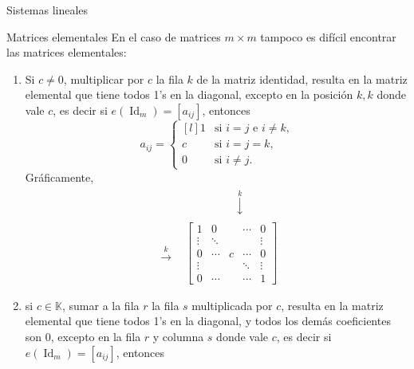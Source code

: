 \documentclass[a4paper,12pt,twoside,spanish,reqno]{amsbook}
\theoremstyle{definition}
\theoremstyle{remark}
\newcommand{\Id}{\operatorname{Id}}
\newcommand{\K}{\mathbb K}
\begin{document}
\begin{chapter}{Sistemas lineales}
\begin{section}{Matrices elementales}
            En el caso de matrices $m \times m$ tampoco es difícil encontrar las matrices elementales:
            \begin{enumerate}
                \item Si $c \not=0$, multiplicar por  $c$ la fila $k$ de la matriz identidad, resulta en la matriz elemental que tiene todos 1's en la diagonal, excepto en la posición $k,k$ donde vale $c$,  es decir si $e(\Id_m) = [a_{ij}]$,  entonces
                \begin{equation}\label{elem-tipo-1}
                a_{ij} = \left\{ 
                \begin{matrix*}[l]
                1 &\text{si $i=j$ e $i\ne k$,}\\
                c &\text{si $i=j=k$,} \\
                0 \quad&\text{si $i \ne j$.}
                \end{matrix*}\right.
                \end{equation}
                Gráficamente,
                \begin{align*}
                &\begin{matrix}
                {}^{}&{}^{}&{}^{}&{}^{}&{}^{}&\overset{k}{\downarrow}&{}^{}&{}^{}&{}^{}
                \end{matrix} \\
                \begin{matrix}
                {}^{}\\
                {}^{}\\
                \overset{k}{\to}\\
                {}^{}\\
                {}^{}
                \end{matrix}
                &\begin{bmatrix}
                1 & 0 &  &\cdots & 0  \\
                \vdots  & \ddots  & & & \vdots \\
                0 & \cdots &c &\cdots &0 \\
                \vdots  &   & &\ddots & \vdots \\
                0  & \cdots  & &\cdots & 1
                \end{bmatrix}
                \end{align*}
                \item si  $c \in \K$, sumar a la fila $r$  la fila $s$ multiplicada por $c$, resulta en la matriz elemental que tiene todos 1's en la diagonal, y todos los demás coeficientes son 0,  excepto en la fila  $r$ y columna $s$ donde  vale $c$,  es decir si $e(\Id_m) = [a_{ij}]$,  entonces

\end{enumerate}
\end{section}
\end{chapter}
\end{document}

